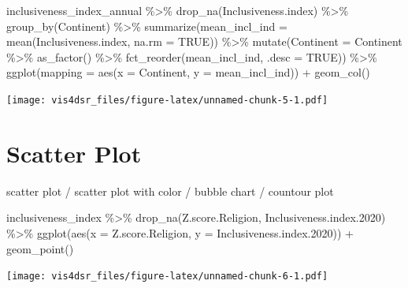 \documentclass[
]{krantz}
\makeatletter
\newenvironment{Shaded}{\begin{snugshade}}{\end{snugshade}}
\newcommand{\AttributeTok}[1]{\textcolor[rgb]{0.61,0.61,0.61}{#1}}
\newcommand{\ConstantTok}[1]{\textcolor[rgb]{0,0,0}{#1}}
\newcommand{\FloatTok}[1]{\textcolor[rgb]{0.06,0.06,0.06}{#1}}
\newcommand{\FunctionTok}[1]{\textcolor[rgb]{0,0,0}{#1}}
\newcommand{\NormalTok}[1]{#1}
\newcommand{\SpecialCharTok}[1]{\textcolor[rgb]{0,0,0}{#1}}
\newenvironment{kframe}{%
\medskip{}
\setlength{\fboxsep}{.8em}
 \def\at@end@of@kframe{}%
 \ifinner\ifhmode%
  \def\at@end@of@kframe{\end{minipage}}%
  \begin{minipage}{\columnwidth}%
 \fi\fi%
 \def\FrameCommand##1{\hskip\@totalleftmargin \hskip-\fboxsep
 \colorbox{shadecolor}{##1}\hskip-\fboxsep
     \hskip-\linewidth \hskip-\@totalleftmargin \hskip\columnwidth}%
 \MakeFramed {\advance\hsize-\width
   \@totalleftmargin\z@ \linewidth\hsize
   \@setminipage}}%
 {\par\unskip\endMakeFramed%
 \at@end@of@kframe}
\renewenvironment{Shaded}{\begin{kframe}}{\end{kframe}}
\makeatother
\begin{document}
\begin{Shaded}
\begin{Highlighting}[]
\NormalTok{inclusiveness\_index\_annual }\SpecialCharTok{\%\textgreater{}\%} 
  \FunctionTok{drop\_na}\NormalTok{(Inclusiveness.index) }\SpecialCharTok{\%\textgreater{}\%}
  \FunctionTok{group\_by}\NormalTok{(Continent) }\SpecialCharTok{\%\textgreater{}\%}
  \FunctionTok{summarize}\NormalTok{(}\AttributeTok{mean\_incl\_ind =} \FunctionTok{mean}\NormalTok{(Inclusiveness.index, }\AttributeTok{na.rm =} \ConstantTok{TRUE}\NormalTok{)) }\SpecialCharTok{\%\textgreater{}\%}
  \FunctionTok{mutate}\NormalTok{(}\AttributeTok{Continent =}\NormalTok{ Continent }\SpecialCharTok{\%\textgreater{}\%} \FunctionTok{as\_factor}\NormalTok{() }\SpecialCharTok{\%\textgreater{}\%} \FunctionTok{fct\_reorder}\NormalTok{(mean\_incl\_ind, }\AttributeTok{.desc =} \ConstantTok{TRUE}\NormalTok{)) }\SpecialCharTok{\%\textgreater{}\%} 
\FunctionTok{ggplot}\NormalTok{(}\AttributeTok{mapping =} \FunctionTok{aes}\NormalTok{(}\AttributeTok{x =}\NormalTok{ Continent, }\AttributeTok{y =}\NormalTok{ mean\_incl\_ind)) }\SpecialCharTok{+}
  \FunctionTok{geom\_col}\NormalTok{()}
\end{Highlighting}
\end{Shaded}

\texttt{[image: vis4dsr\_files/figure-latex/unnamed-chunk-5-1.pdf]}

\hypertarget{scatter-plot}{%
\section{Scatter Plot}\label{scatter-plot}}

scatter plot / scatter plot with color / bubble chart / countour plot

\begin{Shaded}
\begin{Highlighting}[]
\NormalTok{inclusiveness\_index }\SpecialCharTok{\%\textgreater{}\%}
  \FunctionTok{drop\_na}\NormalTok{(Z.score.Religion, Inclusiveness.index}\FloatTok{.2020}\NormalTok{) }\SpecialCharTok{\%\textgreater{}\%}
  \FunctionTok{ggplot}\NormalTok{(}\FunctionTok{aes}\NormalTok{(}\AttributeTok{x =}\NormalTok{ Z.score.Religion, }
             \AttributeTok{y =}\NormalTok{ Inclusiveness.index}\FloatTok{.2020}\NormalTok{)) }\SpecialCharTok{+}
    \FunctionTok{geom\_point}\NormalTok{()}
\end{Highlighting}
\end{Shaded}

\texttt{[image: vis4dsr\_files/figure-latex/unnamed-chunk-6-1.pdf]}
\end{document}

